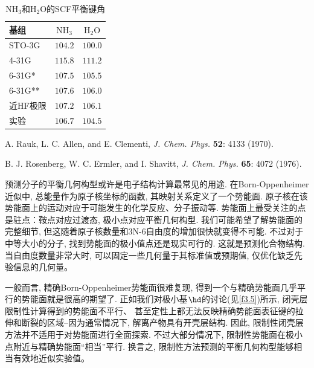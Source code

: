 \begin{table}\centering
	\caption{$\mathrm{NH_3}$和$\mathrm{H_2 O}$的SCF平衡键角}
	\begin{threeparttable}
		\begin{tabular}{l@{\hspace{1.5cm}}c@{\hspace{1.5cm}}c}
			\hline 基组 & $\mathrm{NH_3}$ & $\mathrm{H_2 O}$ \\
			\hline STO-3G & $104.2$ & $100.0$ \\
			4-31G & $115.8$ & $111.2$ \\
			6-31G* & $107.5$ & $105.5$ \\
			6-31G** & $107.6$ & $106.0$ \\
                        近HF极限 & $107.2$\tnote{a} & $106.1$\tnote{b} \\
                        实验 & $106.7$ & $104.5$ \\
			\hline
		\end{tabular}
		\begin{tablenotes}
			\item[a] A. Rauk, L. C. Allen, and E. Clementi, \textit{J. Chem. Phys.} \textbf{52}: 4133 (1970).
			\item[b] B. J. Rosenberg, W. C. Ermler, and I. Shavitt, \textit{J. Chem. Phys.} \textbf{65}: 4072 (1976).
		\end{tablenotes}
	\end{threeparttable}
	\label{tab:3.21}
\end{table}

预测分子的平衡几何构型或许是电子结构计算最常见的用途.
在Born-Oppenheimer近似中, 总能量作为原子核坐标的函数, 其映射关系定义了一个势能面.
原子核在该势能面上的运动对应于可能发生的化学反应、分子振动等.
势能面上最受关注的点是驻点：鞍点对应过渡态, 极小点对应平衡几何构型.
我们可能希望了解势能面的完整细节,
但这随着原子核数量和3N-6自由度的增加很快就变得不可能.
不过对于中等大小的分子, 找到势能面的极小值点还是现实可行的.
这就是预测化合物结构. 
当自由度数量非常大时, 可以固定一些几何量于其标准值或预期值,
仅优化缺乏先验信息的几何量。

一般而言, 精确Born-Oppenheimer势能面很难复现,
得到一个与精确势能面几乎平行的势能面就是很高的期望了.
正如我们对极小基$\hd$的讨论(见\autoref{f3.5})所示,
闭壳层限制性\hft 计算得到的势能面不平行、
甚至定性上都无法反映精确势能面表征键的拉伸和断裂的区域--因为通常情况下,
解离产物具有开壳层结构.
因此, 限制性闭壳层\hft 方法并不适用于对势能面进行全面探索.
不过大部分情况下, 限制性\hft 势能面在极小点附近与精确势能面``相当''平行.
换言之, 限制性\hft 方法预测的平衡几何构型能够相当有效地近似实验值。

